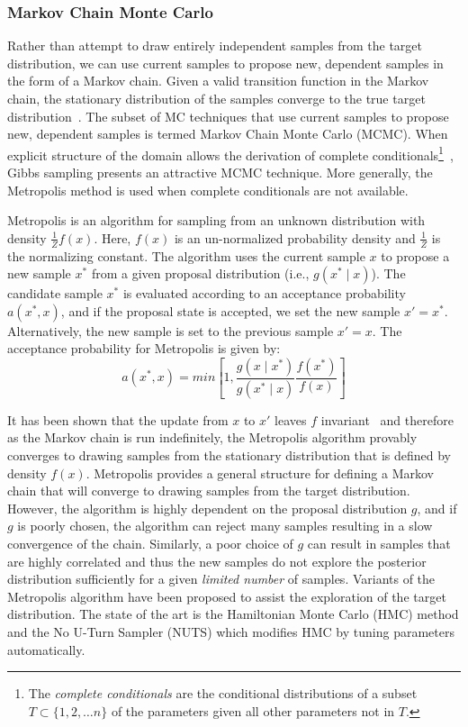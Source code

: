 \subsubsection{Markov Chain Monte Carlo}\label{sec:mcmc}
Rather than attempt to draw entirely independent samples from the target distribution, we can use current samples to propose new, dependent samples in the form of a Markov chain. Given a valid transition function in the Markov chain, the stationary distribution of the samples converge to the true target distribution~\citep{mackay1998introduction}. The subset of MC techniques that use current samples to propose new, dependent samples is termed Markov Chain Monte Carlo (MCMC). When explicit structure of the domain allows the derivation of complete conditionals\footnote{The \textit{complete conditionals} are the conditional distributions of a subset $T \subset \{ 1, 2, \hdots n \}$ of the parameters given all other parameters not in $T$.}~\citep{mackay1998introduction}, Gibbs sampling presents an attractive MCMC technique. More generally, the Metropolis method is used when complete conditionals are not available.

Metropolis is an algorithm for sampling from an unknown distribution with density $\frac{1}{Z} f(x)$. Here, $f(x)$ is an un-normalized probability density and $\frac{1}{Z}$ is the normalizing constant. The algorithm uses the current sample $x$ to propose a new sample $x^*$ from a given proposal distribution (i.e., $g(x^* \mid x)$). The candidate sample $x^*$ is evaluated according to an acceptance probability $a(x^*, x)$, and if the proposal state is accepted, we set the new sample $x' = x^*$. Alternatively, the new sample is set to the previous sample $x' = x$. The acceptance probability for Metropolis is given by:
\begin{equation}
	a(x^*, x) = min \left[ 1, \frac{g(x \mid x^*)}{g(x^* \mid x)} \frac{f(x^*)}{f(x)} \right]
\end{equation}

It has been shown that the update from $x$ to $x'$ leaves $f$ invariant~\citep{mackay1998introduction, gelman2014bayesian} and therefore as the Markov chain is run indefinitely, the Metropolis algorithm provably converges to drawing samples from the stationary distribution that is defined by density $f(x)$. Metropolis provides a general structure for defining a Markov chain that will converge to drawing samples from the target distribution. However, the algorithm is highly dependent on the proposal distribution $g$, and if $g$ is poorly chosen, the algorithm can reject many samples resulting in a slow convergence of the chain. Similarly, a poor choice of $g$ can result in samples that are highly correlated and thus the new samples do not explore the posterior distribution sufficiently for a given \textit{limited number} of samples. Variants of the Metropolis algorithm have been proposed to assist the exploration of the target distribution. The state of the art is the Hamiltonian Monte Carlo (HMC) method and the No U-Turn Sampler (NUTS) which modifies HMC by tuning parameters automatically.

